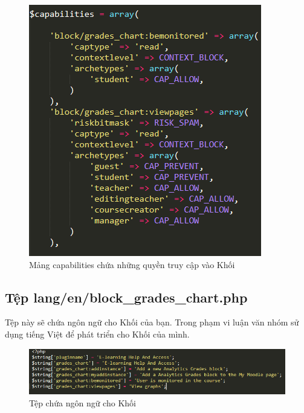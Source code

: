 \begin{center}
	\begin{figure}[htp]
		\begin{center}
			\includegraphics[scale=1]{img/capblock}
		\end{center}
		\caption{Mảng capabilities chứa những quyền truy cập vào Khối}
		\label{refhinh23}
	\end{figure}
\end{center}

\subsection{Tệp lang/en/block\_grades\_chart.php}

Tệp này sẽ chứa ngôn ngữ cho Khối của bạn. Trong phạm vi luận văn nhóm sử dụng tiếng Việt để phát triển cho Khối của mình.

\begin{center}
	\begin{figure}[htp]
		\begin{center}
			\includegraphics[scale=1]{img/langblock}
		\end{center}
		\caption{Tệp chứa ngôn ngữ cho Khối}
		\label{refhinh24}
	\end{figure}
\end{center}

